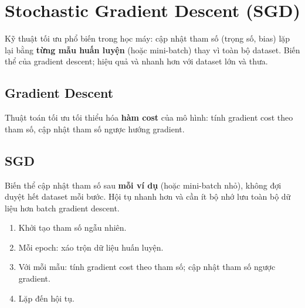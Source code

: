 \section{Stochastic Gradient Descent (SGD)}
\label{sec:sgd}

\begin{dinhnghia}[title={Stochastic Gradient Descent (SGD)}]
Kỹ thuật tối ưu phổ biến trong học máy: cập nhật tham số (trọng số, bias) lặp lại bằng \textbf{từng mẫu huấn luyện} (hoặc mini-batch) thay vì toàn bộ dataset.
Biến thể của gradient descent; hiệu quả và nhanh hơn với dataset lớn và thưa.
\end{dinhnghia}

\subsection{Gradient Descent}

\begin{dinhnghia}[title={Gradient Descent}]
Thuật toán tối ưu tối thiểu hóa \textbf{hàm cost} của mô hình: tính gradient cost theo tham số, cập nhật tham số ngược hướng gradient.
\end{dinhnghia}

\subsection{SGD}

\begin{dinhnghia}[title={SGD}]
Biến thể cập nhật tham số sau \textbf{mỗi ví dụ} (hoặc mini-batch nhỏ), không đợi duyệt hết dataset mỗi bước.
Hội tụ nhanh hơn và cần ít bộ nhớ lưu toàn bộ dữ liệu hơn batch gradient descent.
\end{dinhnghia}

\begin{phuongphap}[title={Thuật toán SGD}]
\begin{enumerate}
  \item Khởi tạo tham số ngẫu nhiên.
  \item Mỗi epoch: xáo trộn dữ liệu huấn luyện.
  \item Với mỗi mẫu: tính gradient cost theo tham số; cập nhật tham số ngược gradient.
  \item Lặp đến hội tụ.
\end{enumerate}
\end{phuongphap}

